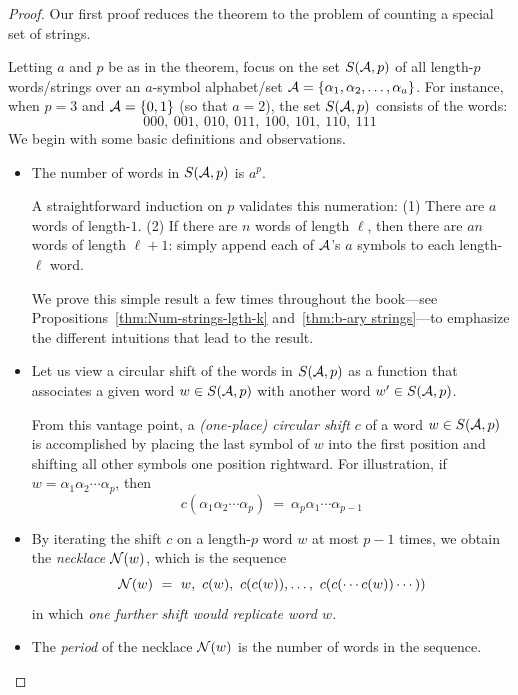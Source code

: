 \begin{proof}
Our first proof reduces the theorem to the problem of counting a special set of strings.

Letting $a$ and $p$ be as in the theorem, focus on the set $S(\mbox{$\cal A$},p)$ of all length-$p$ words/strings over an $a$-symbol alphabet/set $\mbox{$\cal A$} = \{ \alpha_1, \alpha_2, \ldots, \alpha_a \}$.  For instance, when $p=3$ and $\mbox{$\cal A$} = \{0,1\}$ (so that $a=2$), the set $S(\mbox{$\cal A$},p)$ consists of the words:
\[ 000, \ 001, \ 010, \ 011, \ 100, \ 101, \ 110, \ 111 \]
We begin with some basic definitions and observations.
\begin{itemize}
\item
The number of words in $S(\mbox{$\cal A$},p)$ is $a^p$.

\smallskip

A straightforward induction on $p$ validates this numeration:  (1) There are $a$ words of length-$1$. (2) If there are $n$ words of length $\ell$, then there are $an$ words of length $\ell+1$: simply append each of $\mbox{$\cal A$}$'s $a$ symbols to each length-$\ell$ word.

\smallskip

We prove this simple result a few times throughout the book---see Propositions~\ref{thm:Num-strings-lgth-k} and~\ref{thm:b-ary strings}---to emphasize the different intuitions that lead to the result.

\medskip\item
Let us view a circular shift of the words in $S(\mbox{$\cal A$},p)$ as a function that associates a given word $w \in S(\mbox{$\cal A$},p)$ with another word $w' \in S(\mbox{$\cal A$},p)$.

\smallskip

From this vantage point, a {\it (one-place) circular shift} $c$ of a word $w \in S(\mbox{$\cal A$},p)$ is accomplished by placing the last symbol of $w$ into the first position and shifting all other symbols one position rightward.  For illustration, if $w = \alpha_1 \alpha_2 \cdots \alpha_p$, then
\[ c(\alpha_1 \alpha_2 \cdots \alpha_p) \ = \ \alpha_p \alpha_1 \cdots \alpha_{p-1} \]

\medskip\item
By iterating the shift $c$ on a length-$p$ word $w$ at most $p-1$ times, we obtain the {\it necklace} $\mbox{$\cal N$}(w)$, which is the sequence
\[ \n(w) \ = \ w, \ c(w), \ c(c(w)), \ldots, \ c(c(\cdots c(w)) \cdots )) \]
in which {\em one further shift would replicate word $w$.}

\medskip\item
The {\it period} of the necklace $\mbox{$\cal N$}(w)$ is the number of words in the sequence.


\end{itemize}
\end{proof}
